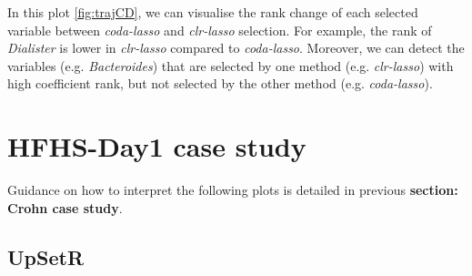 \documentclass[openany]{book}
\begin{document}
In this plot \ref{fig:trajCD}, we can visualise the rank change of each
selected variable between \emph{coda-lasso} and \emph{clr-lasso}
selection. For example, the rank of \emph{Dialister} is lower in
\emph{clr-lasso} compared to \emph{coda-lasso}. Moreover, we can detect
the variables (e.g. \emph{Bacteroides}) that are selected by one method
(e.g. \emph{clr-lasso}) with high coefficient rank, but not selected by
the other method (e.g. \emph{coda-lasso}).

\section{HFHS-Day1 case study}\label{hfhs-day1-case-study-3}

Guidance on how to interpret the following plots is detailed in previous
\textbf{section: Crohn case study}.

\subsection{UpSetR}\label{upsetr-1}
\end{document}

